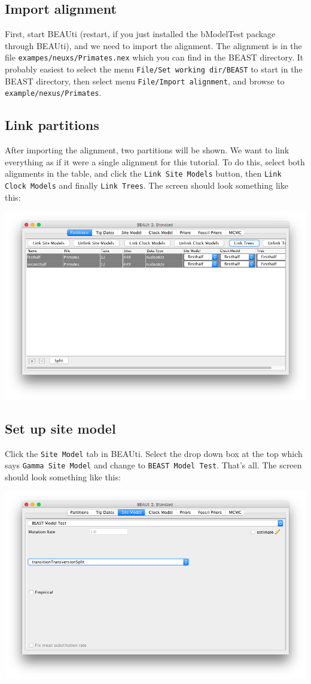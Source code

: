 \documentclass{article}
\begin{document}
\subsection*{Import alignment}First, start BEAUti (restart, if you just installed the bModelTest package through BEAUti), and we need to import the alignment. The alignment is in the file {\tt exampes/neuxs/Primates.nex} which you can find in the BEAST directory. It probably easiest to select the menu {\tt File/Set working dir/BEAST} to start in the BEAST directory, then select menu {\tt File/Import alignment}, and browse to {\tt example/nexus/Primates}.
\subsection*{Link partitions}
After importing the alignment, two partitions will be shown. We want to link everything as if it were a single alignment for this tutorial. To do this, select both alignments in the table, and click the {\tt Link Site Models} button, then {\tt Link Clock Models} and finally {\tt Link Trees}. The screen should look something like this:

\includegraphics[width=\textwidth]{BEAUti_partitions}
\subsection*{Set up site model}
Click the {\tt Site Model} tab in BEAUti. Select the drop down box at the top which says {\tt Gamma Site Model} and change to {\tt BEAST Model Test}. That's all. The screen should look something like this:

\includegraphics[width=\textwidth]{BEAUti_sitemodel}
\end{document}
